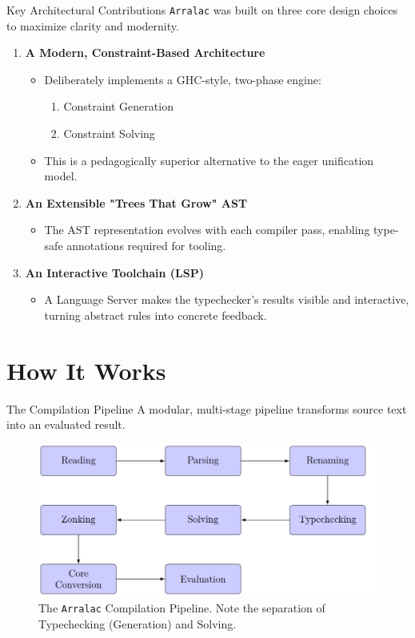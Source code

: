 \documentclass[serif, aspectratio=169]{beamer}
\begin{document}
\begin{frame}{Key Architectural Contributions}
  \texttt{Arralac} was built on three core design choices to maximize clarity and modernity.
  \begin{enumerate}
    \item<1-> \textbf{A Modern, Constraint-Based Architecture}
          \begin{itemize}
            \item Deliberately implements a GHC-style, two-phase engine:
                  \begin{enumerate}
                    \item Constraint Generation
                    \item Constraint Solving
                  \end{enumerate}
            \item This is a pedagogically superior alternative to the eager unification model.
          \end{itemize}
    \item<2-> \textbf{An Extensible "Trees That Grow" AST}
          \begin{itemize}
            \item The AST representation evolves with each compiler pass, enabling type-safe annotations required for tooling.
          \end{itemize}
    \item<3-> \textbf{An Interactive Toolchain (LSP)}
          \begin{itemize}
            \item A Language Server makes the typechecker's results visible and interactive, turning abstract rules into concrete feedback.
          \end{itemize}
  \end{enumerate}
\end{frame}

\section{How It Works}

\begin{frame}{The Compilation Pipeline}
  A modular, multi-stage pipeline transforms source text into an evaluated result.
  \begin{figure}
    \includegraphics[scale=0.3]{pic/pipeline.png} %
    \caption{The \texttt{Arralac} Compilation Pipeline. Note the separation of Typechecking (Generation) and Solving.}
  \end{figure}
\end{frame}
\end{document}
